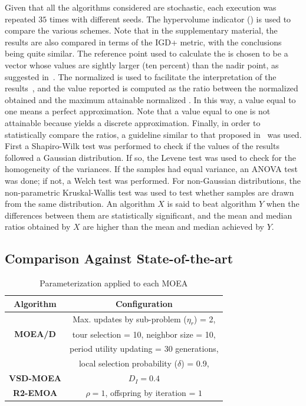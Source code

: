 Given that all the algorithms considered are stochastic, each execution was repeated $35$ times with different seeds.
%
The hypervolume indicator (\HV{}) is used to compare the various schemes.
%
Note that in the supplementary material, the results are also compared in terms of the IGD+ metric, with the conclusions being quite similar.
%
The reference point used to calculate the \HV{} is chosen to be a vector whose values are sightly larger (ten percent) than the nadir point,
as suggested in~\cite{ishibuchi2017reference}.
%
The normalized \HV{} is used to facilitate the interpretation of the results~\cite{li2015evolutionary},
and the value reported is computed as the ratio between the normalized \HV{} obtained and the maximum attainable
normalized \HV{}.
%
In this way, a value equal to one means a perfect approximation.
%
Note that a value equal to one is not attainable because \MOEAS{} yields a discrete approximation.
%
Finally, in order to statistically compare the \HV{} ratios, a guideline similar to that proposed in~\cite{Joel:StatisticalTest} was used.
%
First a Shapiro-Wilk test was performed to check if the values of the results followed a Gaussian distribution.
%
If so, the Levene test was used to check for the homogeneity of the variances.
%
If the samples had equal variance, an ANOVA test was done; if not, a Welch test was performed.
%
For non-Gaussian distributions, the non-parametric Kruskal-Wallis test was used to test whether samples are drawn from the same distribution.
%
An algorithm $X$ is said to beat algorithm $Y$ when the differences between them are statistically significant, and the mean and median \HV{} ratios
obtained by $X$ are higher than the mean and median achieved by $Y$.



\subsection{Comparison Against State-of-the-art}
\begin{table}[t]
\centering
\caption{ Parameterization applied to each MOEA}
\label{tab:Parametrization}
\begin{tabular}{c|c}
\hline
\textbf{Algorithm} & \textbf{Configuration} \\ \hline
\multirow{3}{*}{\textbf{MOEA/D}} &Max. updates by sub-problem ($\eta_r$) = 2, \\
 & tour selection = 10,   neighbor size = 10, \\
 & period utility updating = 30 generations, \\
 & local selection probability ($\delta$) = 0.9,\\ \hline
\textbf{VSD-MOEA} & $D_I=0.4$ \\ \hline
\textbf{R2-EMOA} & $\rho=1$, offspring by iteration = $1$ \\ \hline
\end{tabular}
\end{table}


